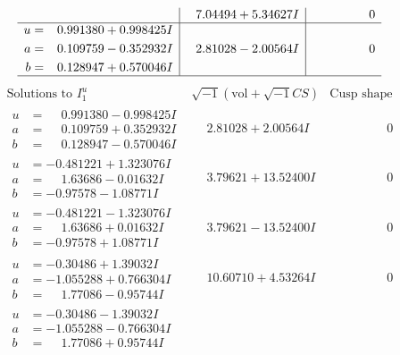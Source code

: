 \documentclass[1p]{elsarticle_modified}
\theoremstyle{definition}
\newcommand{\I}{\sqrt{-1}}
\begin{document}
$$\begin{array}{c|c|c}
 & \phantom{-}7.04494 + 5.34627 I & \phantom{-0.000000 } 0 \\ \hline\begin{aligned}
u &= \phantom{-}0.991380 + 0.998425 I \\
a &= \phantom{-}0.109759 - 0.352932 I \\
b &= \phantom{-}0.128947 + 0.570046 I\end{aligned}
 & \phantom{-}2.81028 - 2.00564 I & \phantom{-0.000000 } 0\\
 \hline 
 \end{array}$$\newpage$$\begin{array}{c|c|c}  
\text{Solutions to }I^u_{1}& \I (\text{vol} + \sqrt{-1}CS) & \text{Cusp shape}\\
 \hline 
\begin{aligned}
u &= \phantom{-}0.991380 - 0.998425 I \\
a &= \phantom{-}0.109759 + 0.352932 I \\
b &= \phantom{-}0.128947 - 0.570046 I\end{aligned}
 & \phantom{-}2.81028 + 2.00564 I & \phantom{-0.000000 } 0 \\ \hline\begin{aligned}
u &= -0.481221 + 1.323076 I \\
a &= \phantom{-}1.63686 - 0.01632 I \\
b &= -0.97578 - 1.08771 I\end{aligned}
 & \phantom{-}3.79621 + 13.52400 I & \phantom{-0.000000 } 0 \\ \hline\begin{aligned}
u &= -0.481221 - 1.323076 I \\
a &= \phantom{-}1.63686 + 0.01632 I \\
b &= -0.97578 + 1.08771 I\end{aligned}
 & \phantom{-}3.79621 - 13.52400 I & \phantom{-0.000000 } 0 \\ \hline\begin{aligned}
u &= -0.30486 + 1.39032 I \\
a &= -1.055288 + 0.766304 I \\
b &= \phantom{-}1.77086 - 0.95744 I\end{aligned}
 & \phantom{-}10.60710 + 4.53264 I & \phantom{-0.000000 } 0 \\ \hline\begin{aligned}
u &= -0.30486 - 1.39032 I \\
a &= -1.055288 - 0.766304 I \\
b &= \phantom{-}1.77086 + 0.95744 I\end{aligned}

\end{array}$$
\end{document}
